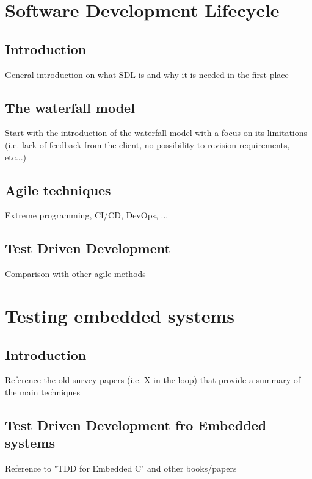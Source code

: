 \newpage
\section{Software Development Lifecycle}
\subsection{Introduction}
General introduction on what SDL is and why it is needed in the first place

\subsection{The waterfall model}
Start with the introduction of the waterfall model with a focus on its limitations (i.e. lack of feedback from the client, no possibility to revision requirements, etc...)


\subsection{Agile techniques}
Extreme programming, CI/CD, DevOps, ...


\subsection{Test Driven Development}
Comparison with other agile methods




\section{Testing embedded systems}
\subsection{Introduction}
Reference the old survey papers (i.e. X in the loop) that provide a summary of the main techniques


\subsection{Test Driven Development fro Embedded systems}
Reference to "TDD for Embedded C" and other books/papers

